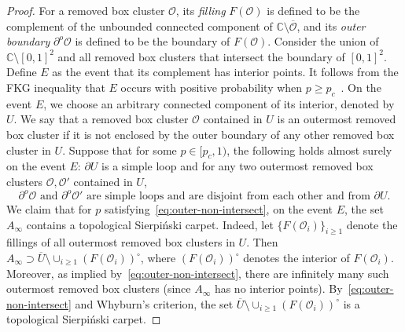 \documentclass[a4paper]{article}
\numberwithin{equation}{section}
\numberwithin{equation}{section}
\renewcommand{\1}{\mathbf{1}}
\begin{document}
\begin{proof}
    
    For a removed box cluster $\mathcal{O}$, its \emph{filling} $F(\mathcal{O})$ is defined to be the complement of the unbounded connected component of $\mathbb{C} \setminus \overline{\mathcal{O}}$, and its \emph{outer boundary} $\partial^o\mathcal{O}$ is defined to be the boundary of $F(\mathcal{O})$. Consider the union of $\mathbb{C} \setminus [0,1]^2$ and all removed box clusters that intersect the boundary of $[0,1]^2$. Define $E$ as the event that its complement has interior points. It follows from the FKG inequality that $E$ occurs with positive probability when $p \geq p_c$~\cite{CCD-fractal}. On the event $E$, we choose an arbitrary connected component of its interior, denoted by $U$.
    We say that a removed box cluster $\mathcal{O}$ contained in $U$ is an outermost removed box cluster if it is not enclosed by the outer boundary of any other removed box cluster in $U$. Suppose that for some $p \in [p_c, 1)$, the following holds almost surely on the event $E$: $\partial U$ is a simple loop and for any two outermost removed box clusters $\mathcal{O}, \mathcal{O}'$ contained in $U$,
    \begin{equation}\label{eq:outer-non-intersect}
        \partial^o \mathcal{O} \mbox{ and } \partial^o \mathcal{O}' \mbox{ are simple loops and are disjoint from each other and from } \partial U. 
    \end{equation}
    We claim that for $p$ satisfying~\eqref{eq:outer-non-intersect}, on the event $E$, the set $A_\infty$ contains a topological Sierpi\'nski carpet. Indeed, let $\{F(\mathcal{O}_i)\}_{i \geq 1}$ denote the fillings of all outermost removed box clusters in $U$. Then $A_\infty \supset \overline{U} \setminus \cup_{i \geq 1}(F(\mathcal{O}_i))^\circ$, where $(F(\mathcal{O}_i))^\circ$ denotes the interior of $F(\mathcal{O}_i)$. Moreover, as implied by~\eqref{eq:outer-non-intersect}, there are infinitely many such outermost removed box clusters (since $A_\infty$ has no interior points). By~\eqref{eq:outer-non-intersect} and Whyburn's criterion, the set $\overline{U} \setminus \cup_{i \geq 1}(F(\mathcal{O}_i))^\circ$ is a topological Sierpi\'nski carpet.


\end{proof}
\end{document}
